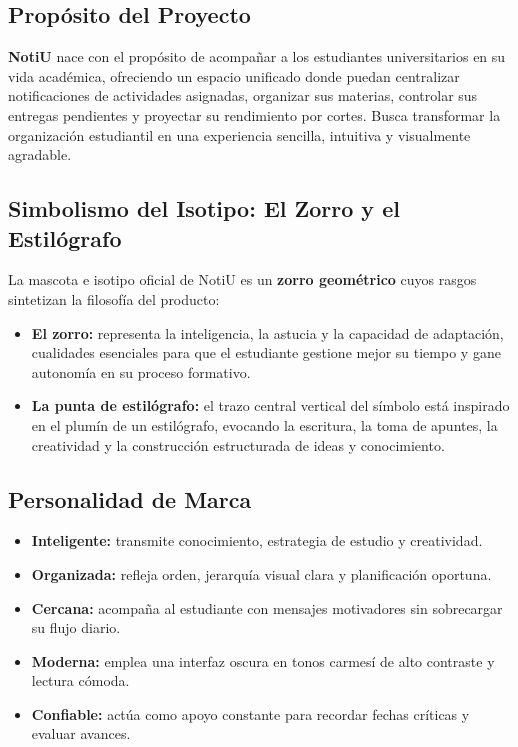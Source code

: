 \documentclass[11pt,letterpaper]{article}
\begin{document}
\subsection{Propósito del Proyecto}
\textbf{NotiU} nace con el propósito de acompañar a los estudiantes universitarios en su vida académica, ofreciendo un espacio unificado donde puedan centralizar notificaciones de actividades asignadas, organizar sus materias, controlar sus entregas pendientes y proyectar su rendimiento por cortes. Busca transformar la organización estudiantil en una experiencia sencilla, intuitiva y visualmente agradable.

\subsection{Simbolismo del Isotipo: El Zorro y el Estilógrafo}
La mascota e isotipo oficial de NotiU es un \textbf{zorro geométrico} cuyos rasgos sintetizan la filosofía del producto:
\begin{itemize}[leftmargin=1.5em, itemsep=3pt]
  \item \textbf{El zorro:} representa la inteligencia, la astucia y la capacidad de adaptación, cualidades esenciales para que el estudiante gestione mejor su tiempo y gane autonomía en su proceso formativo.
  \item \textbf{La punta de estilógrafo:} el trazo central vertical del símbolo está inspirado en el plumín de un estilógrafo, evocando la escritura, la toma de apuntes, la creatividad y la construcción estructurada de ideas y conocimiento.
\end{itemize}

\subsection{Personalidad de Marca}
\begin{itemize}[leftmargin=1.5em, itemsep=2pt]
  \item \textbf{Inteligente:} transmite conocimiento, estrategia de estudio y creatividad.
  \item \textbf{Organizada:} refleja orden, jerarquía visual clara y planificación oportuna.
  \item \textbf{Cercana:} acompaña al estudiante con mensajes motivadores sin sobrecargar su flujo diario.
  \item \textbf{Moderna:} emplea una interfaz oscura en tonos carmesí de alto contraste y lectura cómoda.
  \item \textbf{Confiable:} actúa como apoyo constante para recordar fechas críticas y evaluar avances.
\end{itemize}
\end{document}
